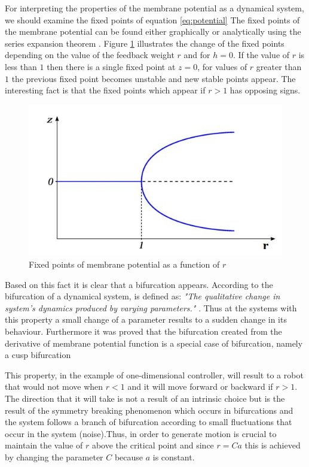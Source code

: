 \documentclass[msc,ai,logo]{infthesis}
\begin{document}
For interpreting the properties of the membrane potential as a dynamical system, we should examine the fixed points of equation \ref{eq:potential} The fixed points of the membrane potential can be found either graphically or analytically using the series expansion theorem \citep{martius:diss10}. Figure \ref{fig:biffuc} illustrates the change of the fixed points depending on the value of the feedback weight $r$ and for $h=0$. If the value of $r$ is less than $1$ then there is a single fixed point at $z=0$, for values of $r$ greater than $1$ the previous fixed point becomes unstable and new stable points appear. The interesting fact is that the fixed points which appear if $r>1$ has opposing signs. 

\begin{figure}[H]
\includegraphics[scale=0.5]{biff.jpg}
\centering
\caption{Fixed points of membrane potential as a function of $r$ \citep{hesse09:diss} }
\label{fig:biffuc}
\end{figure}

Based on this fact it is clear that a bifurcation appears. According to \cite{Guckenheimer:2007} the bifurcation of a dynamical system, is defined as: \textit{"The qualitative change in system's dynamics produced by varying parameters." }. Thus at the systems with this property a small change of a parameter results to a sudden change in its behaviour. Furthermore it was proved that the bifurcation created from the derivative of membrane potential function is a special case of bifurcation, namely a cusp bifurcation \citep[p.~37]{martius:diss10}

This property, in the example of one-dimensional controller, will result to a robot that would not move when $r<1$ and it will move forward or backward if $r>1$. The direction that it will take is not a result of an intrinsic choice but is the result of the symmetry breaking phenomenon which occurs in bifurcations and the system follows a branch of bifurcation according to small fluctuations that occur in the system (noise).Thus, in order to generate motion is crucial to maintain the value of $r$ above the critical point and since $r=Ca$ this is achieved by changing the parameter $C$ because $a$ is constant.   
\end{document}
